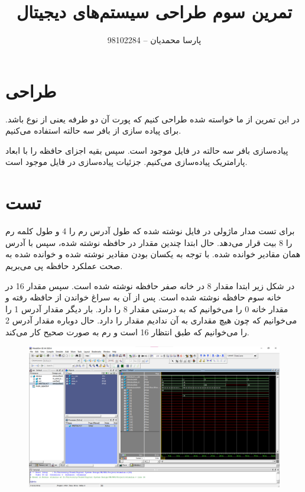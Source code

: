 \documentclass{article}
\title{تمرین سوم طراحی سیستم‌های دیجیتال}
\author{پارسا محمدیان -- 98102284}
\begin{document}
\maketitle
\newpage
\section{طراحی}
در این تمرین از ما خواسته شده  
طراحی کنیم که پورت 
آن دو طرفه یعنی از نوع 
باشد. برای پیاده سازی 
از بافر سه حالته استفاده می‌کنیم.

پیاده‌سازی بافر سه حالته در فایل 
موجود است. سپس بقیه اجزای حافظه را با ابعاد پارامتریک پیاده‌سازی می‌کنیم. جزئیات پیاده‌سازی در فایل 
موجود است.

\section{تست}
برای تست مدار ماژولی در فایل 
نوشته شده که طول آدرس رم را 4 و طول کلمه رم را 8 بیت قرار می‌دهد. حال ابتدا چندین مقدار در حافظه نوشته شده، 
سپس با آدرس همان مقادیر خوانده شده. با توجه به یکسان بودن مقادیر نوشته شده و خوانده شده به صحت عملکرد حافظه 
پی می‌بریم.

در شکل زیر ابتدا مقدار 8 در خانه صفر حافظه 
نوشته شده است. سپس مقدار 16 در خانه سوم حافظه نوشته شده است. 
پس از آن به سراغ خواندن از حافظه رفته و مقدار خانه 0 را می‌خوانیم که به درستی 
مقدار 8 را دارد. بار دیگر مقدار آدرس 1 را می‌خوانیم که چون 
هیچ مقداری به آن ندادیم مقدار 
را دارد. حال دوباره مقدار آدرس 2 را می‌خوانیم که طبق انتظار 16 است و رم به صورت صحیح کار می‌کند.

\begin{figure}[!htbp]
    \centering
    \includegraphics[width=\linewidth]{wave.png}
\end{figure}
\end{document}
